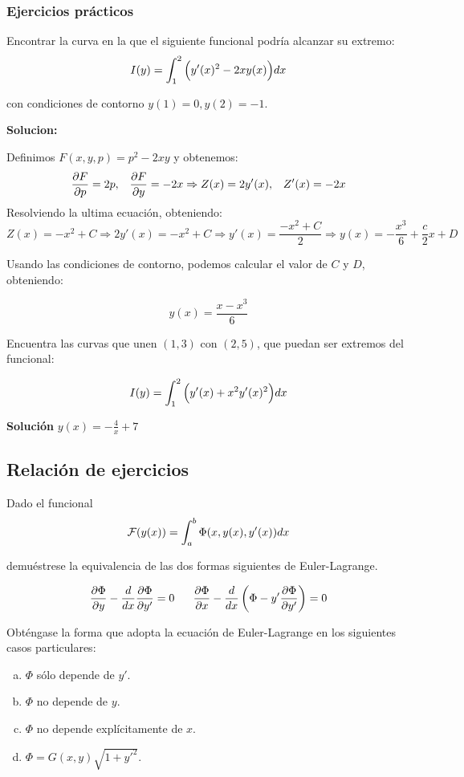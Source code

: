 \subsubsection{Ejercicios prácticos}

\begin{ejercicio*}
Encontrar la curva en la que el siguiente funcional podría alcanzar su extremo:
\[
I(y)=\displaystyle\int_{ 1 }^{ 2 } \Big(y'(x)^2-2xy(x)\Big)dx
\]

con condiciones de contorno $y(1)=0,y(2)=-1$.
\end{ejercicio*}

\textbf{Solucion:}

Definimos $F(x,y,p)=p^2-2xy$ y obtenemos:
\[
\frac{\partial F }{\partial p }=2p, \;\;\; \frac{\partial F }{\partial y }=-2x \Rightarrow Z(x)=2y'(x), \;\;\; Z'(x)=-2x
\]
Resolviendo la ultima ecuación, obteniendo:
\[
Z(x)=-x^2+C \Rightarrow 2y'(x)=-x^2+C \Rightarrow y'(x)=\frac{-x^2+C}{2}\Rightarrow y(x)=-\frac{x^3}{6}+\frac{c}{2}x+D
\]

Usando las condiciones de contorno, podemos calcular el valor de $C$ y $D$, obteniendo:

\[
y(x)=\frac{x-x^3}{6}
\]

\begin{ejercicio*}
Encuentra las curvas que unen $(1,3)$ con $(2,5)$, que puedan ser extremos del funcional:

\[
I(y)=\displaystyle\int_{ 1 }^{ 2 } \Big(y'(x)+x^2y'(x)^2\Big)dx
\]
\end{ejercicio*}

\textbf{Solución} $y(x)=-\frac{4}{x}+7$

\subsection{Relación de ejercicios}

\begin{ejercicio}
Dado el funcional 
\[
\mathcal{F}(y(x))=\displaystyle\int_{ a }^{ b } \Phi(x,y(x),y'(x))dx
\]

demuéstrese la equivalencia de las dos formas siguientes de Euler-Lagrange.

\[
\frac{\partial \Phi }{\partial y }-\frac{d}{dx}\frac{\partial \Phi }{\partial y' }=0 \;\;\;\;\;\; \frac{\partial \Phi }{\partial x }-\frac{d}{dx}\left(\Phi-y'\frac{\partial \Phi }{\partial y' }\right)=0
\]
\end{ejercicio}

\begin{ejercicio}
Obténgase la forma que adopta la ecuación de Euler-Lagrange en los siguientes casos particulares:

\begin{enumerate}[a)]
\item $\Phi$ sólo depende de $y'$.
\item $\Phi$ no depende de $y$.
\item $\Phi$ no depende explícitamente de $x$.
\item $\Phi=G(x,y)\sqrt{1+y'^2}$.
\end{enumerate}
\end{ejercicio}

